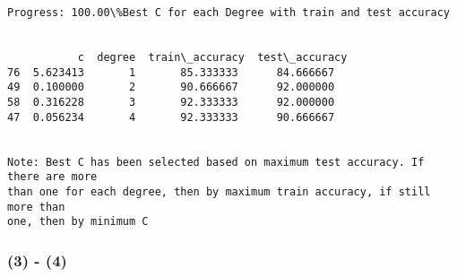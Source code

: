 \documentclass[11pt]{article}
\begin{document}
    \begin{Verbatim}[commandchars=\\\{\}]
 Progress: 100.00\%Best C for each Degree with train and test accuracy


           c  degree  train\_accuracy  test\_accuracy
76  5.623413       1       85.333333      84.666667
49  0.100000       2       90.666667      92.000000
58  0.316228       3       92.333333      92.000000
47  0.056234       4       92.333333      90.666667


Note: Best C has been selected based on maximum test accuracy. If there are more
than one for each degree, then by maximum train accuracy, if still more than
one, then by minimum C
    \end{Verbatim}

    \hypertarget{section}{%
\subsubsection{(3) - (4)}\label{section}}
\end{document}
